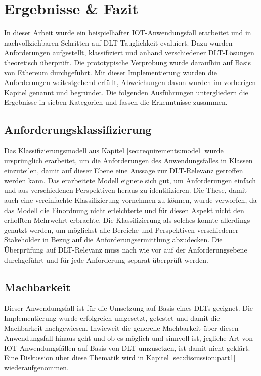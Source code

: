 \chapter{Ergebnisse \& Fazit}
\label{ch:results}
In dieser Arbeit wurde ein beispielhafter \ac{IOT}-Anwendungsfall erarbeitet und in nachvollziehbaren Schritten auf \ac{DLT}-Tauglichkeit evaluiert. Dazu wurden Anforderungen aufgestellt, klassifiziert und anhand verschiedener \ac{DLT}-Lösungen theoretisch überprüft. Die prototypische Verprobung wurde daraufhin auf Basis von Ethereum durchgeführt. Mit dieser Implementierung wurden die Anforderungen weitestgehend erfüllt, Abweichungen davon wurden im vorherigen Kapitel genannt und begründet. Die folgenden Ausführungen untergliedern die Ergebnisse in sieben Kategorien und fassen die Erkenntnisse zusammen.


\section{Anforderungsklassifizierung}
\label{sec:results:classification}
Das Klassifizierungsmodell aus Kapitel \ref{sec:requirements:model} wurde ursprünglich erarbeitet, um die Anforderungen des Anwendungsfalles in Klassen einzuteilen, damit auf dieser Ebene eine Aussage zur \ac{DLT}-Relevanz getroffen werden kann. Das erarbeitete Modell eignete sich gut, um Anforderungen einfach und aus verschiedenen Perspektiven heraus zu identifizieren. Die These, damit auch eine vereinfachte Klassifizierung vornehmen zu können, wurde verworfen, da das Modell die Einordnung nicht erleichterte und für diesen Aspekt nicht den erhofften Mehrwehrt erbrachte. Die Klassifizierung als solches konnte allerdings genutzt werden, um möglichst alle Bereiche und Perspektiven verschiedener Stakeholder in Bezug auf die Anforderungsermittlung abzudecken. Die Überprüfung auf \ac{DLT}-Relevanz muss nach wie vor auf der Anforderungsebene durchgeführt und für jede Anforderung separat überprüft werden.

\section{Machbarkeit}
\label{sec:results:feasibility}
Dieser Anwendungsfall ist für die Umsetzung auf Basis eines \ac{DLT}s geeignet. Die Implementierung wurde erfolgreich umgesetzt, getestet und damit die Machbarkeit nachgewiesen. Inwieweit die generelle Machbarkeit über diesen Anwendungsfall hinaus geht und ob es möglich und sinnvoll ist, jegliche Art von \ac{IOT}-Anwendungsfällen auf Basis von \ac{DLT} umzusetzen, ist damit nicht geklärt. Eine Diskussion über diese Thematik wird in Kapitel \ref{sec:discussion:part1} wiederaufgenommen.

